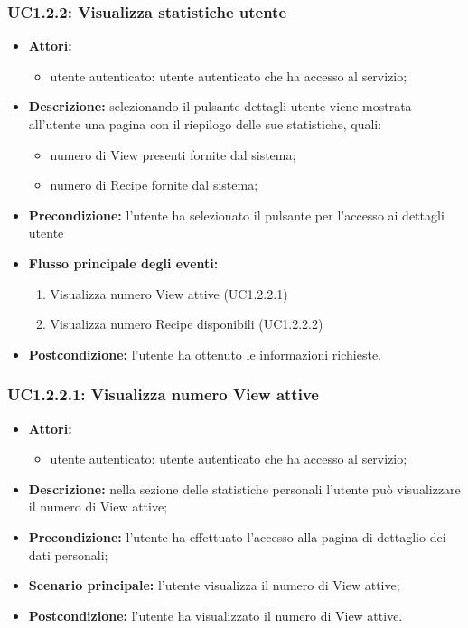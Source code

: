 \subsubsection{UC1.2.2: Visualizza statistiche utente}
\begin{itemize}
	\item \textbf{Attori:}
	\begin{itemize}
		\item utente autenticato: utente autenticato che ha accesso al servizio;
	\end{itemize}
	\item \textbf{Descrizione:} selezionando il pulsante dettagli utente viene mostrata all'utente una pagina con il riepilogo delle sue statistiche, quali:
	\begin{itemize}
		\item numero di View presenti fornite dal sistema;
		\item numero di Recipe fornite dal sistema;
	\end{itemize}
  \item \textbf{Precondizione:} l'utente ha selezionato il pulsante per l'accesso ai dettagli utente
	\item \textbf{Flusso principale degli eventi:}
	\begin{enumerate}
		\item Visualizza numero View attive (UC1.2.2.1)
		\item Visualizza numero Recipe disponibili (UC1.2.2.2)
	\end{enumerate}
	\item \textbf{Postcondizione:} l'utente ha ottenuto le informazioni richieste.
\end{itemize}

\subsubsection{UC1.2.2.1: Visualizza numero View attive}
\begin{itemize}
	\item \textbf{Attori:}
	\begin{itemize}
		\item utente autenticato: utente autenticato che ha accesso al servizio;
	\end{itemize}
	\item \textbf{Descrizione:} nella sezione delle statistiche personali l'utente può visualizzare il numero di View attive;
	\item \textbf{Precondizione:} l'utente ha effettuato l'accesso alla pagina di dettaglio dei dati personali;
	\item \textbf{Scenario principale:} l'utente visualizza il numero di View attive;
	\item \textbf{Postcondizione:} l'utente ha visualizzato il numero di View attive.
\end{itemize}

